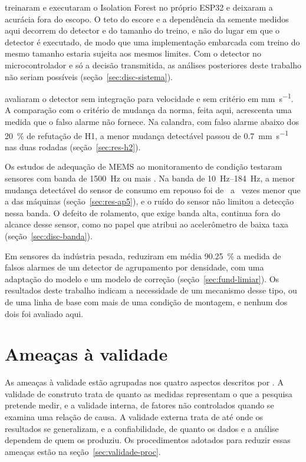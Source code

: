  treinaram e executaram o Isolation Forest no próprio ESP32 e deixaram a acurácia fora do escopo. O teto do escore e a dependência da semente medidos aqui decorrem do detector e do tamanho do treino, e não do lugar em que o detector é executado, de modo que uma implementação embarcada com treino do mesmo tamanho estaria sujeita aos mesmos limites. Com o detector no microcontrolador e só a decisão transmitida, as análises posteriores deste trabalho não seriam possíveis (seção~\ref{sec:disc-sistema}).

 avaliaram o detector sem integração para velocidade e sem critério em \si{\milli\meter\per\second}. A comparação com o critério de mudança da norma, feita aqui, acrescenta uma medida que o falso alarme não fornece. Na calandra, com falso alarme abaixo dos \SI{20}{\percent} de refutação de H1, a menor mudança detectável passou de \SI{0,7}{\milli\meter\per\second} nas duas rodadas (seção~\ref{sec:res-h2}).

Os estudos de adequação de MEMS ao monitoramento de condição testaram sensores com banda de \SI{1500}{\hertz} ou mais \cite{albarbar2008,fidali2024}. Na banda de \SIrange{10}{184}{\hertz}, a menor mudança detectável do sensor de consumo em repouso foi de \apCincoRazaoMin\ a \apCincoRazaoMax\ vezes menor que a das máquinas (seção~\ref{sec:res-ap5}), e o ruído do sensor não limitou a detecção nessa banda. O defeito de rolamento, que exige banda alta, continua fora do alcance desse sensor, como no papel que  atribui ao acelerômetro de baixa taxa (seção~\ref{sec:disc-banda}).

Em sensores da indústria pesada,  reduziram em média \SI{90,25}{\percent} a medida de falsos alarmes de um detector de agrupamento por densidade, com uma adaptação do modelo e um modelo de correção (seção~\ref{sec:fund-limiar}). Os resultados deste trabalho indicam a necessidade de um mecanismo desse tipo, ou de uma linha de base com mais de uma condição de montagem, e nenhum dos dois foi avaliado aqui.

\section{Ameaças à validade}\label{sec:limitacoes}

As ameaças à validade estão agrupadas nos quatro aspectos descritos por . A validade de construto trata de quanto as medidas representam o que a pesquisa pretende medir, e a validade interna, de fatores não controlados quando se examina uma relação de causa. A validade externa trata de até onde os resultados se generalizam, e a confiabilidade, de quanto os dados e a análise dependem de quem os produziu. Os procedimentos adotados para reduzir essas ameaças estão na seção~\ref{sec:validade-proc}.

